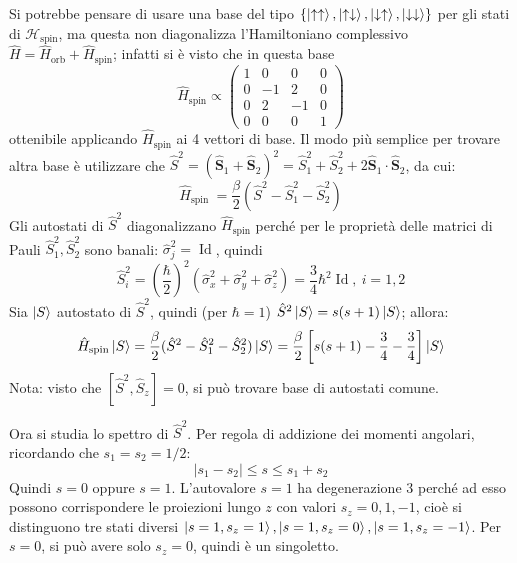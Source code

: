 \documentclass[11pt, a4paper]{scrartcl} %
\numberwithin{equation}{subsection}
\theoremstyle{style2}
\theoremstyle{style1}
\begin{document}
\begin{enumerate}[(1).]
Si potrebbe pensare di usare una base del tipo $\left\{ \ket{\uparrow \uparrow}, \ket{\uparrow\downarrow} , \ket{\downarrow\uparrow} , \ket{\downarrow\downarrow}   \right\} $ per gli stati di $\mathcal{H}_\text{spin}$, ma questa non diagonalizza l'Hamiltoniano complessivo $\hat{H}= \hat{H}_\text{orb}+\hat{H}_\text{spin}$;
infatti si \`e visto che in questa base
\[
	\hat{H}_\text{spin}\propto \begin{pmatrix} 1 &0&0&0\\ 0& - 1 &  2 & 0  \\ 0& 2 & - 1 &0 \\ 0&0&0&1 \end{pmatrix} 
\] 
ottenibile applicando $\hat{H}_\text{spin}$ ai 4 vettori di base. 
Il modo pi\`u semplice per trovare altra base \`e utilizzare che $\hat{S}^2 = (\hat{\mathbf{S} }_1+\hat{\mathbf{S} }_2)^2 = \hat{S}_1^2 + \hat{S}_2^2 + 2 \hat{\mathbf{S} }_1 \cdot \hat{\mathbf{S} }_2$, da cui:
\begin{equation}
	\hat{H}_\text{spin }= \frac{\beta }{2} (\hat{S}^2 - \hat{S}_1 ^2 - \hat{S}_2^2)
\end{equation}
Gli autostati di $\hat{S}^2$ diagonalizzano $\hat{H}_\text{spin}$ perch\'e per le propriet\`a delle matrici di Pauli $\hat{S}_1^2 , \hat{S}_2^2$ sono banali: $\hat{\sigma }_j ^2 = \operatorname{Id} $, quindi
\[
	\hat{S}_i^2 = \left(\frac{\hbar }{2}\right) ^2 (\hat{\sigma }_x^2 + \hat{\sigma }_y^2 + \hat{\sigma }_z^2) = \frac{3}{4}\hbar ^2 \operatorname{Id}, \ i = 1,2
\] 
Sia $\ket{S} $ autostato di $\hat{S}^2$, quindi (per $\hbar =1$) $\hat{S}^2 \ket{S} = s(s+1) \ket{S} $; allora:
\[
\hat{H}_\text{spin}\ket{S}  = \frac{\beta }{2}(\hat{S}^2 - \hat{S}_1^2 - \hat{S}_2^2) \ket{S}  = \frac{\beta }{2} \left[ s(s+1) - \frac{3}{4} - \frac{3}{4} \right] \ket{S} 
\] 
Nota: visto che $[\hat{S}^2 , \hat{S}_z]=0$, si pu\`o trovare base di autostati comune.

Ora si studia lo spettro di $\hat{S}^2$. Per regola di addizione dei momenti angolari, ricordando che $s_1= s_2 = 1 / 2$: 
\begin{equation}
	\lvert s_1-s_2 \rvert \le s \le  s_1 + s_2
\end{equation}
Quindi $s=0$ oppure $s=1$. L'autovalore $s=1$ ha degenerazione $3$ perch\'e ad esso possono corrispondere le proiezioni lungo $z$ con valori $s_z=0,1,-1$, cio\`e si distinguono tre stati diversi $\ket{s=1, s_z = 1} , \ket{s=1,s_z=0} ,  \ket{s=1, s_z=-1} $. 
Per $s=0$, si pu\`o avere solo $s_z= 0$, quindi \`e un singoletto.


\end{enumerate}
\end{document}
